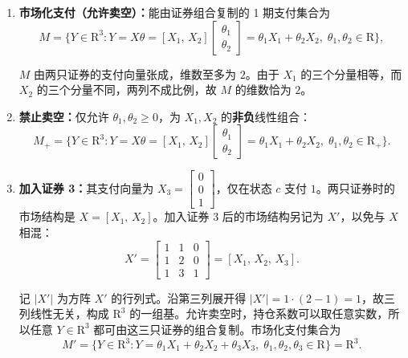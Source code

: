 \begin{solution}[blank-type=manual,blank-vsep=9\baselineskip]
\begin{enumerate}[label=(\alph*)]
    总价值为 $K S_1+2K S_2$。

    \item \textbf{市场化支付（允许卖空）：}能由证券组合复制的 1 期支付集合为
    \[
        M=\bigl\{Y\in\mathrm{R}^{3}: Y=X\theta=[X_1,\,X_2]\begin{bmatrix}\theta_1 \\ \theta_2\end{bmatrix}=\theta_1 X_1+\theta_2 X_2,\;\theta_1,\theta_2\in\mathrm{R}\bigr\},
    \]

    $M$ 由两只证券的支付向量张成，维数至多为 $2$。由于 $X_1$ 的三个分量相等，而 $X_2$ 的三个分量不同，两列不成比例，故 $M$ 的维数恰为 $2$。

    \item \textbf{禁止卖空：}仅允许 $\theta_1,\theta_2\ge 0$，为 $X_1,X_2$ 的\textbf{非负}线性组合：
    \[
        M_{+}=\bigl\{Y\in\mathrm{R}^{3}: Y=X\theta=[X_1,\,X_2]\begin{bmatrix}\theta_1 \\ \theta_2\end{bmatrix}=\theta_1 X_1+\theta_2 X_2,\;\theta_1,\theta_2\in\mathrm{R}_{+}\bigr\}.
    \]

    \item \textbf{加入证券 3：}其支付向量为 $X_3=\begin{bmatrix}0 \\ 0 \\ 1\end{bmatrix}$，仅在状态 $c$ 支付 $1$。两只证券时的市场结构是 $X=[X_1,\,X_2]$。加入证券 3 后的市场结构另记为 $X'$，以免与 $X$ 相混：
    \[
        X'=\begin{bmatrix}1&1&0\\1&2&0\\1&3&1\end{bmatrix}=[X_1,\,X_2,\,X_3].
    \]

    记 $\lvert X'\rvert$ 为方阵 $X'$ 的行列式。沿第三列展开得 $\lvert X'\rvert=1\cdot(2-1)=1$，故三列线性无关，构成 $\mathrm{R}^3$ 的一组基。允许卖空时，持仓系数可以取任意实数，所以任意 $Y\in\mathrm{R}^3$ 都可由这三只证券的组合复制。市场化支付集合为
    \[
        M'=\bigl\{Y\in\mathrm{R}^{3}: Y=\theta_1 X_1+\theta_2 X_2+\theta_3 X_3,\;\theta_1,\theta_2,\theta_3\in\mathrm{R}\bigr\}=\mathrm{R}^{3}.
    \]
\end{enumerate}
\end{solution}

